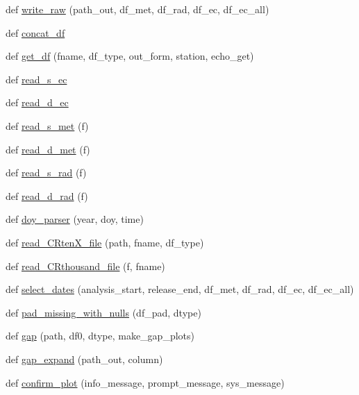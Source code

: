 \begin{DoxyCompactItemize}
def \hyperlink{namespaceet__util_a41b39b3c70ba9961221c284cc738122e}{write\+\_\+raw} (path\+\_\+out, df\+\_\+met, df\+\_\+rad, df\+\_\+ec, df\+\_\+ec\+\_\+all)
\item 
def \hyperlink{namespaceet__util_afe6d9320f59488fc7e462d7c501e828d}{concat\+\_\+df}
\item 
def \hyperlink{namespaceet__util_a8013dc0897f9430ae8f354ba094b9fbd}{get\+\_\+df} (fname, df\+\_\+type, out\+\_\+form, station, echo\+\_\+get)
\item 
def \hyperlink{namespaceet__util_a7535fb2ada235d852a05717bdd6d67a9}{read\+\_\+s\+\_\+ec}
\item 
def \hyperlink{namespaceet__util_a5cda9dc3d34bdd80d01b977e805f4b04}{read\+\_\+d\+\_\+ec}
\item 
def \hyperlink{namespaceet__util_a5cfb9371164d33036c4d3ec9f7a80e88}{read\+\_\+s\+\_\+met} (f)
\item 
def \hyperlink{namespaceet__util_aa20b5ae88dbfb272ae5e7f53f4678358}{read\+\_\+d\+\_\+met} (f)
\item 
def \hyperlink{namespaceet__util_a37255b034ed791b14cb66dc5df649a3f}{read\+\_\+s\+\_\+rad} (f)
\item 
def \hyperlink{namespaceet__util_a76d5a5c19f0e86b9ab70c0957827c260}{read\+\_\+d\+\_\+rad} (f)
\item 
def \hyperlink{namespaceet__util_add60caac6c3d8333a58794a411891f57}{doy\+\_\+parser} (year, doy, time)
\item 
def \hyperlink{namespaceet__util_a566ff749c2a2c113c58d24649251bd5b}{read\+\_\+\+C\+Rten\+X\+\_\+file} (path, fname, df\+\_\+type)
\item 
def \hyperlink{namespaceet__util_af15d3c41901948dbb10f0c796cb6ed5b}{read\+\_\+\+C\+Rthousand\+\_\+file} (f, fname)
\item 
def \hyperlink{namespaceet__util_a38dc0fbf4d56c116d7f8eb34a893abad}{select\+\_\+dates} (analysis\+\_\+start, release\+\_\+end, df\+\_\+met, df\+\_\+rad, df\+\_\+ec, df\+\_\+ec\+\_\+all)
\item 
def \hyperlink{namespaceet__util_a9d53464743ec890e7b0a9d367d09a6ad}{pad\+\_\+missing\+\_\+with\+\_\+nulls} (df\+\_\+pad, dtype)
\item 
def \hyperlink{namespaceet__util_a15b819dcfa7f04be44839a9887e62c41}{gap} (path, df0, dtype, make\+\_\+gap\+\_\+plots)
\item 
def \hyperlink{namespaceet__util_a86bdf627c5eafcab2d20a7d1ce75a1ed}{gap\+\_\+expand} (path\+\_\+out, column)
\item 
def \hyperlink{namespaceet__util_a90f4dcfab0e13429f6041ea3b2db13b4}{confirm\+\_\+plot} (info\+\_\+message, prompt\+\_\+message, sys\+\_\+message)

\end{DoxyCompactItemize}
